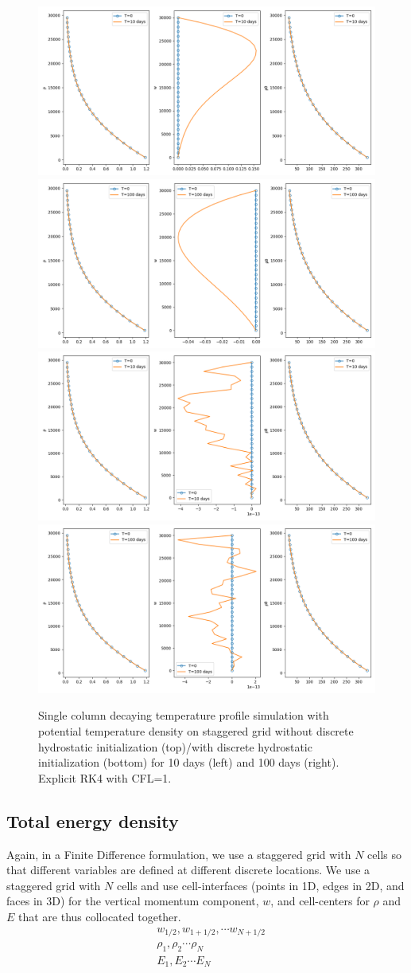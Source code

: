 \documentclass{report}
\begin{document}
\begin{figure}
    \centering
    \includegraphics[width=0.45 \textwidth]{CLIMA-numerics/figures/staggered/HB-Theta-10-HB-false.png}
    \includegraphics[width=0.45 \textwidth]{CLIMA-numerics/figures/staggered/HB-Theta-100-HB-false.png}
    \includegraphics[width=0.45 \textwidth]{CLIMA-numerics/figures/staggered/HB-Theta-10-HB-true.png}
    \includegraphics[width=0.45 \textwidth]{CLIMA-numerics/figures/staggered/HB-Theta-100-HB-true.png}
    \caption{Single column decaying temperature profile simulation with potential temperature density on staggered grid without discrete hydrostatic initialization (top)/with discrete hydrostatic initialization (bottom) for 10 days (left) and 100 days (right). Explicit RK4 with CFL=1.}
    \label{fig:my_label}
\end{figure}



\subsection{Total energy density}
Again, in a Finite Difference formulation, we use a staggered grid with $N$ cells so that different variables are defined at different discrete locations. We use a staggered grid with $N$ cells and use cell-interfaces (points in 1D, edges in 2D, and faces in 3D) for the vertical momentum component, $w$, and cell-centers for $\rho$ and $E$ that are thus collocated together.
\begin{align*}
&w_{1/2},          w_{1+1/2},          \cdots w_{N+1/2} \\
&\rho_{1}, \rho_{2} \cdots \rho_{N} \\
&E_{1}, E_{2} \cdots E_{N}
\end{align*}
\end{document}
